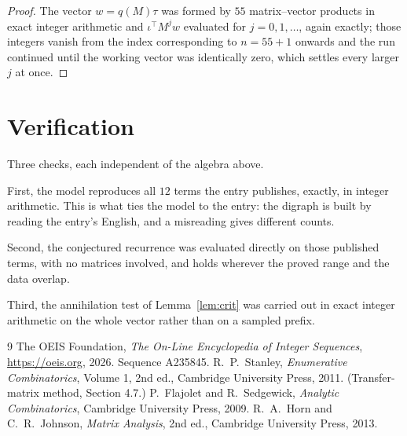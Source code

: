 \documentclass[11pt,a4paper]{article}
\theoremstyle{plain}
\theoremstyle{definition}
\begin{document}
\begin{proof}
The vector $w=q(M)\tau$ was formed by $55$ matrix--vector products in exact integer
arithmetic and $\iota^{\!\top}M^{j}w$ evaluated for $j=0,1,\dots$, again exactly; those
integers vanish from the index corresponding to $n=55+1$ onwards and the run continued
until the working vector was identically zero, which settles every larger $j$ at once.
\end{proof}

\section{Verification}

Three checks, each independent of the algebra above.

First, the model reproduces all $12$ terms the entry publishes, exactly, in integer
arithmetic. This is what ties the model to the entry: the digraph is built by reading the
entry's English, and a misreading gives different counts.

Second, the conjectured recurrence was evaluated directly on those published terms, with no
matrices involved, and holds wherever the proved range and the data overlap.

Third, the annihilation test of Lemma~\ref{lem:crit} was carried out in exact integer
arithmetic on the whole vector rather than on a sampled prefix.

\begin{thebibliography}{9}
 The OEIS Foundation, \emph{The On-Line Encyclopedia of Integer
Sequences}, \url{https://oeis.org}, 2026. Sequence A235845.
 R.~P.~Stanley, \emph{Enumerative Combinatorics}, Volume 1, 2nd ed.,
Cambridge University Press, 2011. (Transfer-matrix method, Section 4.7.)
 P.~Flajolet and R.~Sedgewick, \emph{Analytic Combinatorics}, Cambridge
University Press, 2009.
 R.~A.~Horn and C.~R.~Johnson, \emph{Matrix Analysis}, 2nd ed., Cambridge
University Press, 2013.
\end{thebibliography}
\end{document}
